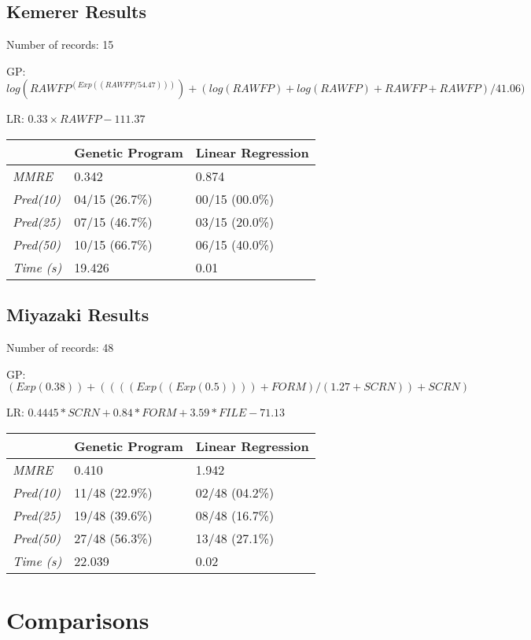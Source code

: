 \documentclass[11pt, a4paper]{article}
\begin{document}
\subsection{Kemerer Results} %
\label{sub:kemerer_results}
Number of records: 15

GP: \(log(RAWFP^{(Exp((RAWFP / 54.47)))}) + (log (RAWFP) + log (RAWFP) + RAWFP +
RAWFP) / 41.06)\)

LR: \(0.33 \times RAWFP - 111.37\)

\begin{tabularx}{\textwidth}{| l | X | X |}
\hline
 & \textbf{Genetic Program} & \textbf{Linear Regression} \\
\hline
\emph{MMRE} & 0.342 & 0.874 \\
\hline
\emph{Pred(10)} & 04/15 (26.7\%) & 00/15 (00.0\%) \\
\emph{Pred(25)} & 07/15 (46.7\%) & 03/15 (20.0\%) \\
\emph{Pred(50)} & 10/15 (66.7\%) & 06/15 (40.0\%) \\
\hline
\emph{Time (s)} & 19.426 & 0.01 \\
\hline
\end{tabularx}

\subsection{Miyazaki Results} %
\label{sub:miyazaki_results}
Number of records: 48

GP: \((Exp(0.38)) + ((((Exp((Exp(0.5)))) + FORM) / (1.27 + SCRN)) + SCRN)\)

LR: \(0.4445 * SCRN + 0.84 * FORM + 3.59 * FILE - 71.13\)

\begin{tabularx}{\textwidth}{| l | X | X |}
\hline
 & \textbf{Genetic Program} & \textbf{Linear Regression} \\
\hline
\emph{MMRE} & 0.410 & 1.942 \\
\hline
\emph{Pred(10)} & 11/48 (22.9\%) & 02/48 (04.2\%) \\
\emph{Pred(25)} & 19/48 (39.6\%) & 08/48 (16.7\%) \\
\emph{Pred(50)} & 27/48 (56.3\%) & 13/48 (27.1\%) \\
\hline
\emph{Time (s)} & 22.039 & 0.02 \\
\hline
\end{tabularx}

\section{Comparisons} %
\label{sec:comparisons}
\end{document}
